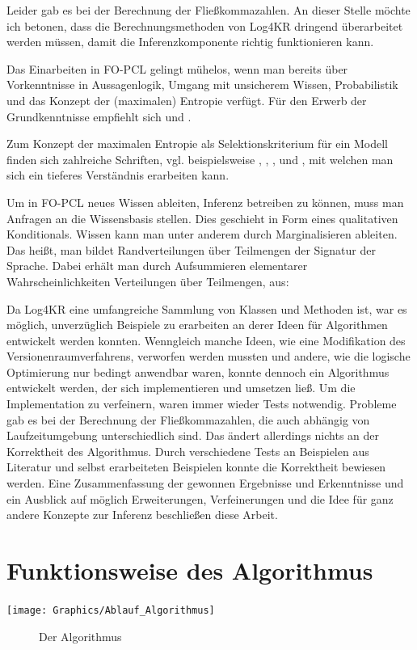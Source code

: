 \documentclass[draft]{scrreprt}
\begin{document}
Leider gab es bei der Berechnung der Fließkommazahlen. An dieser Stelle möchte ich betonen, dass die Berechnungsmethoden von Log4KR dringend überarbeitet werden müssen, damit die Inferenzkomponente richtig funktionieren kann.

Das Einarbeiten in FO-PCL gelingt mühelos, wenn man bereits über Vorkenntnisse in Aussagenlogik, Umgang mit unsicherem Wissen, Probabilistik  und das Konzept der (maximalen) Entropie verfügt. Für den Erwerb der Grundkenntnisse empfiehlt sich \cite{BKI08} und \cite{KK06}.

Zum Konzept der maximalen Entropie als Selektionskriterium für ein Modell finden sich zahlreiche Schriften, vgl. beispielsweise \cite{BHM14}, \cite{BK15}, \cite{Fis10}, \cite{RKI97} und \cite{TFLKIB10}, mit welchen man sich ein tieferes Verständnis erarbeiten kann.

Um in FO-PCL neues Wissen ableiten,  Inferenz betreiben zu können, muss man Anfragen an die Wissensbasis stellen. Dies geschieht in Form eines qualitativen Konditionals. Wissen kann man unter anderem durch Marginalisieren ableiten. Das heißt, man bildet Randverteilungen über Teilmengen der Signatur der Sprache. Dabei erhält man durch Aufsummieren elementarer Wahrscheinlichkeiten Verteilungen über Teilmengen, aus: \cite[Anhang A.2]{BKI08}

Da Log4KR eine umfangreiche Sammlung von Klassen und Methoden ist, war es möglich, unverzüglich Beispiele zu erarbeiten an derer Ideen für Algorithmen entwickelt werden konnten. Wenngleich manche Ideen, wie eine Modifikation des Versionenraumverfahrens, verworfen werden mussten und andere, wie die logische Optimierung nur bedingt anwendbar waren, konnte dennoch ein Algorithmus entwickelt werden, der sich implementieren und umsetzen ließ. Um die Implementation zu verfeinern, waren immer wieder Tests notwendig. Probleme gab es bei der Berechnung der Fließkommazahlen, die auch abhängig von Laufzeitumgebung unterschiedlich sind. Das ändert allerdings nichts an der Korrektheit des Algorithmus.
Durch verschiedene Tests an Beispielen aus Literatur und selbst erarbeiteten Beispielen konnte die Korrektheit bewiesen werden.
Eine Zusammenfassung der gewonnen Ergebnisse und Erkenntnisse und ein Ausblick auf möglich Erweiterungen, Verfeinerungen und die Idee für ganz andere Konzepte zur Inferenz beschließen diese Arbeit. 



\section{Funktionsweise des Algorithmus}
\texttt{[image: Graphics/Ablauf\_Algorithmus]}
\begin{figure}[h]
	
	
	
	\caption{Der Algorithmus }
	
\end{figure}
\end{document}
